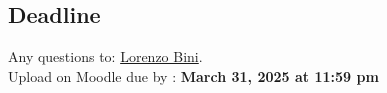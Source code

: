 \subsection*{Deadline}
Any questions to: \href{mailto:Lorenzo.Bini@unige.ch}{Lorenzo Bini}.\\
Upload on Moodle due by : \textbf{March 31, 2025 at 11:59 pm}